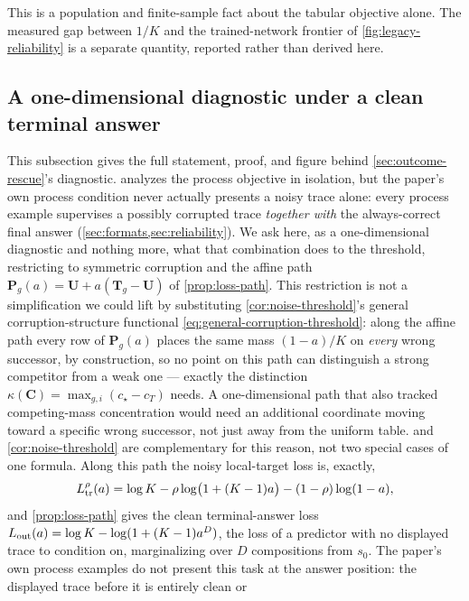 This is a population and finite-sample fact about the tabular objective
alone. The measured gap between $1/K$ and the trained-network frontier of
\cref{fig:legacy-reliability} is a separate quantity, reported rather than
derived here.

\subsection{A one-dimensional diagnostic under a clean terminal answer}
\label{app:outcome-rescue-diagnostic}

This subsection gives the full statement, proof, and figure behind
\cref{sec:outcome-rescue}'s diagnostic.  analyzes
the process objective in isolation, but the paper's own process condition
never actually presents a noisy trace alone: every process example
supervises a possibly corrupted trace \emph{together with} the
always-correct final answer (\cref{sec:formats,sec:reliability}). We ask
here, as a one-dimensional diagnostic and nothing more, what that
combination does to the threshold, restricting to symmetric corruption and
the affine path $\bm{P}_g(a)=\bm{U}+a(\bm{T}_g-\bm{U})$ of
\cref{prop:loss-path}. This restriction is not a simplification we could
lift by substituting \cref{cor:noise-threshold}'s general
corruption-structure functional \cref{eq:general-corruption-threshold}: along the affine path every row of
$\bm{P}_g(a)$ places the same mass $(1-a)/K$ on \emph{every} wrong
successor, by construction, so no point on this path can distinguish a
strong competitor from a weak one --- exactly the distinction
$\kappa(\bm{C})=\max_{g,i}(c_\star-c_T)$ needs. A one-dimensional path that
also tracked competing-mass concentration would need an additional
coordinate moving toward a specific wrong successor, not just away from
the uniform table.  and \cref{cor:noise-threshold}
are complementary for this reason, not two special cases of one formula.
Along this path the noisy local-target loss is,
exactly,
\begin{equation}
 L^\rho_{\rm tr}(a) = \log K - \rho\log\bigl(1+(K-1)a\bigr) - (1-\rho)\log(1-a),
 \label{eq:noisy-process-path-loss}
\end{equation}
and \cref{prop:loss-path} gives the clean terminal-answer loss
$L_{\rm out}(a)=\log K-\log(1+(K-1)a^D)$, the loss of a predictor with no
displayed trace to condition on, marginalizing over $D$ compositions from
$s_0$. The paper's own process examples do not present this task at the
answer position: the displayed trace before it is entirely clean or
